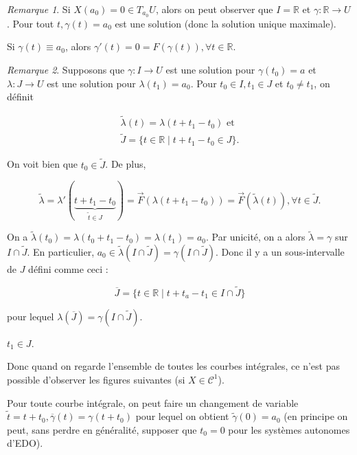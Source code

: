 \documentclass[french]{article}
\theoremstyle{definition}
\theoremstyle{remark}
\newtheorem*{remark}{Remarque}
\begin{document}
\begin{remark}
  Si \(X(a_0) = 0 \in T _{a_0} U\), alors on peut observer que \(I = \mathbb{R}\) et \(\gamma : \mathbb{R} \longrightarrow U\). Pour tout \(t, \gamma(t) = a_0\) est une solution (donc la solution unique maximale).

  Si \(\gamma(t) \equiv a_0\), alors \(\gamma'(t) = 0 = F (\gamma(t)), \forall t \in \mathbb{R}\).
\end{remark}

\begin{remark}
  Supposons que \(\gamma : I \longrightarrow U\) est une solution pour \(\gamma(t_0) = a\) et \(\lambda : J \longrightarrow U\) est une solution pour \(\lambda(t_1) = a_0\). Pour \(t_0 \in I, t_1 \in J\) et \(t_0 \neq t_1\), on définit

  \begin{gather*}
    \tilde{\lambda}(t) = \lambda(t + t_1 - t_0) \text{ et }  \\
    \tilde{J} = \{ t \in \mathbb{R} \mid t + t_1 - t_0 \in J \}.
  \end{gather*}

  On voit bien que \(t_0 \in \tilde{J}\). De plus,

  \[\tilde{\lambda} = \lambda'(\underbrace{t + t_1 - t_0}_{\tilde{t}\in J}) = \overrightarrow{F}(\lambda(t + t_1 - t_0)) = \overrightarrow{F}(\tilde{\lambda}(t)), \forall t \in \tilde{J}. \]

  On a \(\tilde{\lambda}(t_0) = \lambda(t_0 + t_1 - t_0) = \lambda(t_1) = a_0\). Par unicité, on a alors \(\tilde{\lambda} = \gamma\) sur \(I \cap \tilde{J}\). En particulier, \(a_0 \in \tilde{\lambda}(I \cap \tilde{J}) = \gamma(I \cap \tilde{J})\). Donc il y a un sous-intervalle de \(J\) défini comme ceci :

  \[\overline{J} = \{  t \in \mathbb{R} \mid t + t_a - t_1 \in I \cap \tilde{J} \}\]

  pour lequel \(\lambda(\overline{J}) = \gamma(I \cap \tilde{J})\).

  {\selectfont{}\relax} \(t_1 \in J\).

  Donc quand on regarde l'ensemble de toutes les courbes intégrales, ce n'est pas possible d'observer les figures suivantes (si \(X \in \mathcal{C}^1\)).
\end{remark}

Pour toute courbe intégrale, on peut faire un changement de variable \(\tilde{t} = t+ t_0, \overline{\gamma}(t) = \gamma(t + t_0)\) pour lequel on obtient \(\tilde{\gamma}(0) = a_0\) (en principe on peut, sans perdre en généralité, supposer que \(t_0 = 0\) pour les systèmes autonomes d'EDO).
\end{document}
